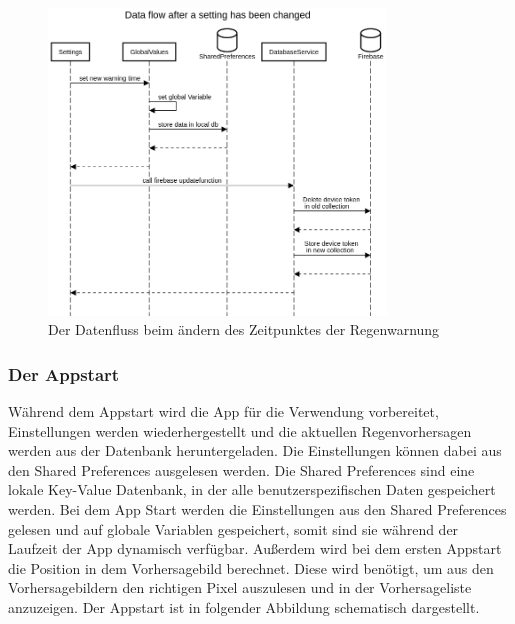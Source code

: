 \begin{figure}[H]
 \centering
 \includegraphics[width=0.8\textwidth,angle=0]{abb/sequence_diagram_change_settings}
 \caption[Sequencediagram Einstellungen ändern]{Der Datenfluss beim ändern des Zeitpunktes der Regenwarnung}
\label{fig:sequence_diagram_change_settings}
\end{figure}

\subsubsection{Der Appstart}
Während dem Appstart wird die App für die Verwendung vorbereitet, Einstellungen werden wiederhergestellt und
die aktuellen Regenvorhersagen werden aus der Datenbank heruntergeladen. 
Die Einstellungen können dabei aus den Shared Preferences ausgelesen werden. 
Die Shared Preferences sind eine lokale Key-Value Datenbank, in der alle benutzerspezifischen Daten gespeichert werden. 
Bei dem App Start werden die Einstellungen aus den Shared Preferences gelesen und auf globale Variablen gespeichert, somit
sind sie während der Laufzeit der App dynamisch verfügbar. 
Außerdem wird bei dem ersten Appstart die Position in dem Vorhersagebild berechnet. 
Diese wird benötigt, um aus den Vorhersagebildern den richtigen Pixel auszulesen und in der Vorhersageliste anzuzeigen.
Der Appstart ist in folgender Abbildung schematisch dargestellt.

